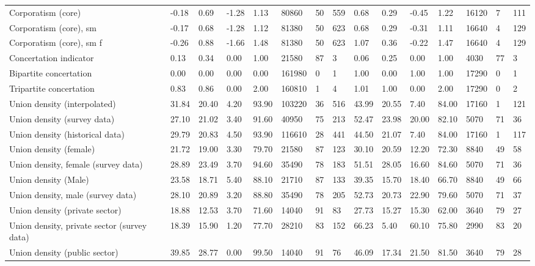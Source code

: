 \begin{longtable}{lllllllllllllll}
Corporatism (core) & -0.18 & 0.69 & -1.28 & 1.13 & 80860 & 50 & 559 & 0.68 & 0.29 & -0.45 & 1.22 & 16120 & 7 & 111\\
\addlinespace
Corporatism (core), sm & -0.17 & 0.68 & -1.28 & 1.12 & 81380 & 50 & 623 & 0.68 & 0.29 & -0.31 & 1.11 & 16640 & 4 & 129\\
Corporatism (core), sm f & -0.26 & 0.88 & -1.66 & 1.48 & 81380 & 50 & 623 & 1.07 & 0.36 & -0.22 & 1.47 & 16640 & 4 & 129\\
Concertation indicator & 0.13 & 0.34 & 0.00 & 1.00 & 21580 & 87 & 3 & 0.06 & 0.25 & 0.00 & 1.00 & 4030 & 77 & 3\\
Bipartite concertation & 0.00 & 0.00 & 0.00 & 0.00 & 161980 & 0 & 1 & 1.00 & 0.00 & 1.00 & 1.00 & 17290 & 0 & 1\\
Tripartite concertation & 0.83 & 0.86 & 0.00 & 2.00 & 160810 & 1 & 4 & 1.01 & 1.00 & 0.00 & 2.00 & 17290 & 0 & 2\\
\addlinespace
Union density (interpolated) & 31.84 & 20.40 & 4.20 & 93.90 & 103220 & 36 & 516 & 43.99 & 20.55 & 7.40 & 84.00 & 17160 & 1 & 121\\
Union density (survey data) & 27.10 & 21.02 & 3.40 & 91.60 & 40950 & 75 & 213 & 52.47 & 23.98 & 20.00 & 82.10 & 5070 & 71 & 36\\
Union density (historical data) & 29.79 & 20.83 & 4.50 & 93.90 & 116610 & 28 & 441 & 44.50 & 21.07 & 7.40 & 84.00 & 17160 & 1 & 117\\
Union density (female) & 21.72 & 19.00 & 3.30 & 79.70 & 21580 & 87 & 123 & 30.10 & 20.59 & 12.20 & 72.30 & 8840 & 49 & 58\\
Union density, female (survey data) & 28.89 & 23.49 & 3.70 & 94.60 & 35490 & 78 & 183 & 51.51 & 28.05 & 16.60 & 84.60 & 5070 & 71 & 36\\
\addlinespace
Union density (Male) & 23.58 & 18.71 & 5.40 & 88.10 & 21710 & 87 & 133 & 39.35 & 15.70 & 18.40 & 66.70 & 8840 & 49 & 66\\
Union density, male (survey data) & 28.10 & 20.89 & 3.20 & 88.80 & 35490 & 78 & 205 & 52.73 & 20.73 & 22.90 & 79.60 & 5070 & 71 & 37\\
Union density (private sector) & 18.88 & 12.53 & 3.70 & 71.60 & 14040 & 91 & 83 & 27.73 & 15.27 & 15.30 & 62.00 & 3640 & 79 & 27\\
Union density, private sector (survey data) & 18.39 & 15.90 & 1.20 & 77.70 & 28210 & 83 & 152 & 66.23 & 5.40 & 60.10 & 75.80 & 2990 & 83 & 20\\
Union density (public sector) & 39.85 & 28.77 & 0.00 & 99.50 & 14040 & 91 & 76 & 46.09 & 17.34 & 21.50 & 81.50 & 3640 & 79 & 28\\

\end{longtable}
